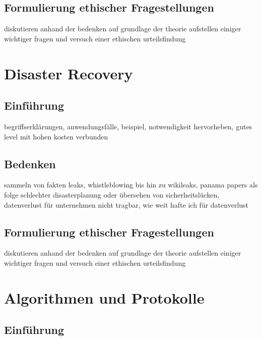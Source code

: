 \documentclass[letterpaper, 12pt]{article}
\let\tempsection\section
\renewcommand\section[1]{\vspace{-0.3cm}\tempsection{#1}\vspace{-0.3cm}}
\let\tempsubsection\subsection
\renewcommand\subsection[1]{\vspace{0cm}\tempsubsection{#1}\vspace{0cm}}
\begin{document}
\subsection{Formulierung ethischer Fragestellungen}

diskutieren anhand der bedenken auf grundlage der theorie \newline
aufstellen einiger wichtiger fragen und versuch einer ethischen urteilsfindung

\clearpage

\section{Disaster Recovery}

\subsection{Einführung}

begriffserklärungen, anwendungsfälle, beispiel, notwendigkeit hervorheben, gutes level mit hohen kosten verbunden

\subsection{Bedenken}

sammeln von fakten \newline
leaks, whistleblowing bis hin zu wikileaks, panama papers als folge schlechter disasterplanung oder übersehen von sicherheitslücken, datenverlust für unternehmen nicht tragbar, wie weit hafte ich für datenverlust

\subsection{Formulierung ethischer Fragestellungen}

diskutieren anhand der bedenken auf grundlage der theorie \newline
aufstellen einiger wichtiger fragen und versuch einer ethischen urteilsfindung

\clearpage

\section{Algorithmen und Protokolle}

\subsection{Einführung}
\end{document}
